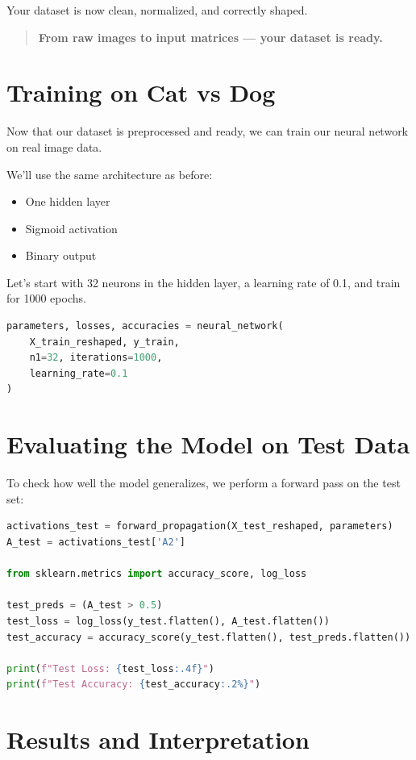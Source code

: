 \documentclass[11pt]{article}
\begin{document}
Your dataset is now clean, normalized, and correctly shaped.

\begin{quote}
\textbf{From raw images to input matrices — your dataset is ready.}
\end{quote}

\section*{Training on Cat vs Dog}

Now that our dataset is preprocessed and ready, we can train our neural network on real image data.

We’ll use the same architecture as before:
\begin{itemize}
    \item One hidden layer
    \item Sigmoid activation
    \item Binary output
\end{itemize}

Let’s start with 32 neurons in the hidden layer, a learning rate of 0.1, and train for 1000 epochs.

\begin{lstlisting}[language=Python]
parameters, losses, accuracies = neural_network(
    X_train_reshaped, y_train,
    n1=32, iterations=1000,
    learning_rate=0.1
)
\end{lstlisting}

\section*{Evaluating the Model on Test Data}

To check how well the model generalizes, we perform a forward pass on the test set:

\begin{lstlisting}[language=Python]
activations_test = forward_propagation(X_test_reshaped, parameters)
A_test = activations_test['A2']

from sklearn.metrics import accuracy_score, log_loss

test_preds = (A_test > 0.5)
test_loss = log_loss(y_test.flatten(), A_test.flatten())
test_accuracy = accuracy_score(y_test.flatten(), test_preds.flatten())

print(f"Test Loss: {test_loss:.4f}")
print(f"Test Accuracy: {test_accuracy:.2%}")
\end{lstlisting}

\section*{Results and Interpretation}
\end{document}
